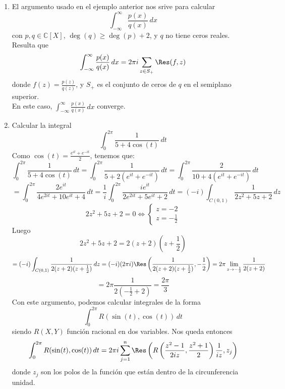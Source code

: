 \begin{enumerate}
    \item El argumento usado en el ejemplo anterior nos srive para calcular
\[
    \int_{-\infty}^{\infty} \frac{p(x)}{q(x)} \, dx
\]
con $p,q \in \mathbb{C}[X]$, $\deg(q) \geq \deg(p) + 2$, y $q$ no tiene ceros reales.\\
Resulta que 
\[
    \int_{-\infty}^{\infty} \frac{p(x)}{q(x)} \, dx = 2 \pi i \sum_{z \in S_+} \Res(f,z)
\]
donde $f(z) = \frac{p(z)}{q(z)}$, y $S_+$ es el conjunto de ceros de $q$ en el semiplano superior.\\
En este caso, $\int_{-\infty}^{\infty} \frac{p(x)}{q(x)} \, dx$ converge.
    \item Calcular la integral
    \[
        \int_{0}^{2 \pi} \frac{1}{5+4\cos(t)} \, dt
    \]
    Como $\cos(t) = \frac{e^{i t} + e^{-i t}}{2}$, tenemos que:
    \[
        \int_{0}^{2 \pi} \frac{1}{5+4\cos(t)} \, dt =
        \int_{0}^{2 \pi} \frac{1}{5 + 2 (e^{i t} + e^{-i t})} \, dt =
        \int_{0}^{2 \pi} \frac{2}{10 + 4 (e^{i t} + e^{-i t})} \, dt 
    \]
    \[
        = \int_{0}^{2 \pi} \frac{2 e^{i t}}{4 e^{2 i t} + 10 e^{i t} + 4} \, dt = \frac{1}{i} \int_{0}^{2 \pi} \frac{ie^{i t}}{2 e^{2 i t} + 5 e^{i t} + 2} \, dt = (-i) \int_{C(0,1)} \frac{1}{2 z^{2} + 5 z + 2} \, dz
    \]
    \[
        2z^2 + 5z + 2 = 0 \iff \begin{cases}
            z = -2 \\
            z = -\frac{1}{2}
        \end{cases}
    \]
    Luego
    \[
        2z^2 + 5z + 2 = 2 (z+2) (z+\frac{1}{2})
    \]
    \[
        = (-i) \int_{C(0,1)} \frac{1}{2 (z+2) (z+\frac{1}{2})} \, dz =
        (-i) (2 \pi i) \Res\left( \frac{1}{2 (z+2) (z+\frac{1}{2})}, -\frac{1}{2} \right) = 2 \pi \lim_{z \to -\frac{1}{2}} \frac{1}{2 (z+2)} 
    \]
    \[
        = 2 \pi \frac{1}{2 \left( -\frac{1}{2} + 2 \right)} = \frac{2 \pi}{3}
    \]
    Con este argumento, podemos calcular integrales de la forma 
    \[
        \int_{0}^{2 \pi} R(\sin(t), \cos(t)) \, dt
    \]
    siendo $R(X,Y)$ función racional en dos variables. Nos queda entonces
    \[
        \int_{0}^{2 \pi} R(\sin(t), \cos(t)) \, dt = 2 \pi i \sum_{j=1}^{n} \Res \left( R \left( \frac{z^2-1}{2 iz}, \frac{z^2+1}{2}\right) \frac{1}{iz}, z_j \right)
    \]
    donde $z_j$ son los polos de la función que están dentro de la circunferencia unidad.
\end{enumerate}

